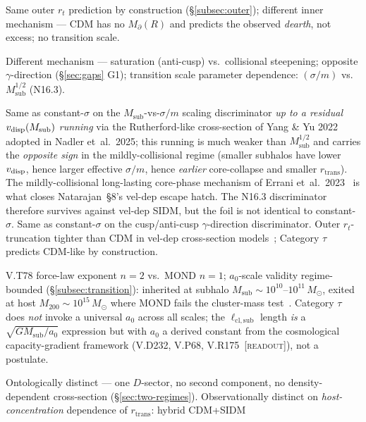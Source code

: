 \documentclass{pantarhei-researchnote}
\newcommand{\aMOND}{a_0}                        %
\newcommand{\ellsub}{\ell_{\mathrm{cl},\mathrm{sub}}}  %
\newcommand{\Mpa}{M_{\partial}}                 %
\newcommand{\Msub}{M_{\mathrm{sub}}}
\newcommand{\Mtwohun}{M_{200}}
\newcommand{\Msun}{M_{\odot}}
\newcommand{\rtran}{r_{\mathrm{trans}}}
\newcommand{\readout}{\textsc{[readout]}}
\newcommand{\falsifierID}[1]{\textsc{N16.#1}}
\begin{document}
\begin{description}[leftmargin=1.7em,itemsep=0.3em]
\item[CDM (collisionless).] Same outer $r_t$ prediction by construction
(\S\ref{subsec:outer}); different inner mechanism --- CDM has no
$\Mpa(R)$ and predicts the observed \emph{dearth}, not excess; no
transition scale.
\item[Constant-$\sigma$ SIDM.] Different mechanism --- saturation
(anti-cusp) vs.\ collisional steepening; opposite $\gamma$-direction
(\S\ref{sec:gaps} G1); transition scale parameter dependence:
$(\sigma/m)$ vs.\ $\Msub^{1/2}$ (\falsifierID{3}).
\item[Velocity-dependent SIDM.] Same as constant-$\sigma$ on the
$\Msub$-vs-$\sigma/m$ scaling discriminator \emph{up to a residual
$v_{\rm disp}(\Msub)$ running} via the Rutherford-like cross-section of
Yang \& Yu 2022~\cite{YangYu2022} adopted in Nadler et~al.\ 2025; this
running is much weaker than $\Msub^{1/2}$ and carries the
\emph{opposite sign} in the mildly-collisional regime (smaller subhalos
have lower $v_{\rm disp}$, hence larger effective $\sigma/m$, hence
\emph{earlier} core-collapse and smaller $\rtran$). The mildly-collisional
long-lasting core-phase mechanism of Errani et~al.\
2023~\cite{Errani2023} is what closes Natarajan~\S{}8's vel-dep escape
hatch. The \falsifierID{3} discriminator therefore survives against
vel-dep SIDM, but the foil is not identical to constant-$\sigma$.
Same as constant-$\sigma$ on the cusp/anti-cusp $\gamma$-direction
discriminator. Outer $r_t$-truncation tighter than CDM in vel-dep
cross-section models~\cite{Nadler2025}; Category $\tau$ predicts CDM-like
by construction.
\item[MOND.] V.T78 force-law exponent $n = 2$ vs.\ MOND $n = 1$;
$\aMOND$-scale validity regime-bounded
(\S\ref{subsec:transition}): inherited at subhalo $\Msub \sim
10^{10}$--$10^{11}\,\Msun$, exited at host $\Mtwohun \sim 10^{15}\,\Msun$
where MOND fails the cluster-mass test~\cite{Famaey2025}. Category $\tau$
does \emph{not} invoke a universal $\aMOND$ across all scales; the
$\ellsub$ length \emph{is} a $\sqrt{G\Msub/\aMOND}$ expression but with
$\aMOND$ a derived constant from the cosmological capacity-gradient
framework (V.D232, V.P68, V.R175~\readout), not a postulate.
\item[Hybrid CDM+SIDM.] Ontologically distinct --- one $D$-sector, no
second component, no density-dependent cross-section
(\S\ref{sec:two-regimes}). Observationally distinct on
\emph{host-concentration} dependence of $\rtran$: hybrid CDM+SIDM

\end{description}
\end{document}
